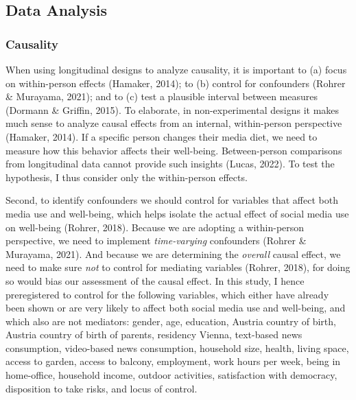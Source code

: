 \documentclass[
  man,mask,floatsintext]{apa7}
\begin{document}
\hypertarget{data-analysis}{%
\subsection{Data Analysis}\label{data-analysis}}

\hypertarget{causality}{%
\subsubsection{Causality}\label{causality}}

When using longitudinal designs to analyze causality, it is important to (a) focus on within-person effects (Hamaker, 2014); to (b) control for confounders (Rohrer \& Murayama, 2021); and to (c) test a plausible interval between measures (Dormann \& Griffin, 2015).
To elaborate, in non-experimental designs it makes much sense to analyze causal effects from an internal, within-person perspective (Hamaker, 2014).
If a specific person changes their media diet, we need to measure how this behavior affects their well-being.
Between-person comparisons from longitudinal data cannot provide such insights (Lucas, 2022).
To test the hypothesis, I thus consider only the within-person effects.

Second, to identify confounders we should control for variables that affect both media use and well-being, which helps isolate the actual effect of social media use on well-being (Rohrer, 2018).
Because we are adopting a within-person perspective, we need to implement \emph{time-varying} confounders (Rohrer \& Murayama, 2021).
And because we are determining the \emph{overall} causal effect, we need to make sure \emph{not} to control for mediating variables (Rohrer, 2018), for doing so would bias our assessment of the causal effect.
In this study, I hence preregistered to control for the following variables, which either have already been shown or are very likely to affect both social media use and well-being, and which also are not mediators:
gender, age, education, Austria country of birth, Austria country of birth of parents, residency Vienna, text-based news consumption, video-based news consumption, household size, health, living space, access to garden, access to balcony, employment, work hours per week, being in home-office, household income, outdoor activities, satisfaction with democracy, disposition to take risks, and locus of control.
\end{document}
